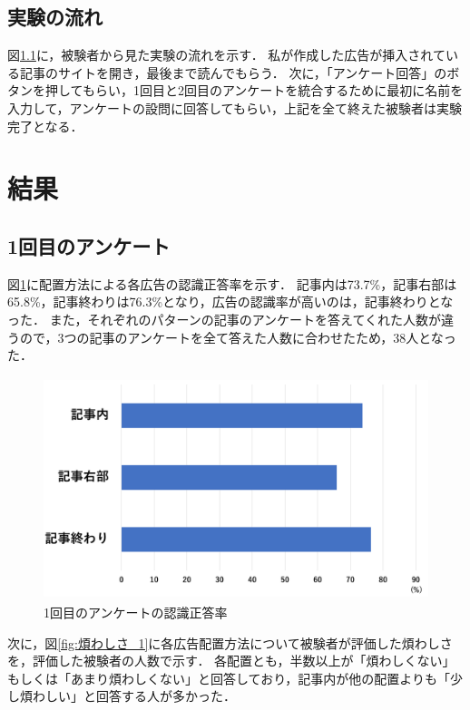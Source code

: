 \documentclass[12pt,a4j,titlepage]{ltjsarticle}
\begin{document}
\subsection{実験の流れ}
図\ref{}に，被験者から見た実験の流れを示す．
私が作成した広告が挿入されている記事のサイトを開き，最後まで読んでもらう．
次に，「アンケート回答」のボタンを押してもらい，1回目と2回目のアンケートを統合するために最初に名前を入力して，アンケートの設問に回答してもらい，上記を全て終えた被験者は実験完了となる．

\clearpage

\section{結果}
\subsection{1回目のアンケート}
図\ref{fig:広告認識正答率_1}に配置方法による各広告の認識正答率を示す．
記事内は73.7\%，記事右部は65.8\%，記事終わりは76.3\%となり，広告の認識率が高いのは，記事終わりとなった．
また，それぞれのパターンの記事のアンケートを答えてくれた人数が違うので，3つの記事のアンケートを全て答えた人数に合わせたため，38人となった．

\begin{figure}[h]
\begin{center}
 \includegraphics[height=65mm]{figures/広告認識正答率_1.pdf}
\end{center}
 \caption{1回目のアンケートの認識正答率}
 \label{fig:広告認識正答率_1}
\end{figure}

次に，図\ref{fig:煩わしさ_1}に各広告配置方法について被験者が評価した煩わしさを，評価した被験者の人数で示す．
各配置とも，半数以上が「煩わしくない」もしくは「あまり煩わしくない」と回答しており，記事内が他の配置よりも「少し煩わしい」と回答する人が多かった．
\end{document}
